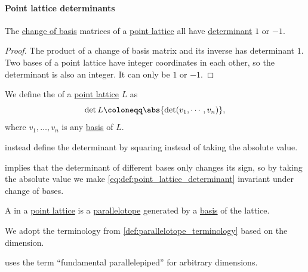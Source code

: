 \paragraph{Point lattice determinants}

\begin{proposition}\label{thm:point_lattice_determinant}
  The \hyperref[con:change_of_basis]{change of basis} matrices of a \hyperref[def:point_lattice]{point lattice} all have \hyperref[def:matrix_determinant]{determinant} \( 1 \) or \( -1 \).
\end{proposition}
\begin{proof}
  The product of a change of basis matrix and its inverse has determinant \( 1 \). Two bases of a point lattice have integer coordinates in each other, so the determinant is also an integer. It can only be \( 1 \) or \( -1 \).
\end{proof}

\begin{definition}\label{def:point_lattice_determinant}
  We define the  of a \hyperref[def:point_lattice]{point lattice} \( L \) as
  \begin{equation}\label{eq:def:point_lattice_determinant}
    \det L \coloneqq \abs{ \det(v_1, \cdots, v_n) },
  \end{equation}
  where \( v_1, \ldots, v_n \) is any \hyperref[def:point_lattice_basis]{basis} of \( L \).
\end{definition}
\begin{comments}
  \item \Textcite[5]{ConwaySloane1998SpherePackings} instead define the determinant by squaring instead of taking the absolute value.
\end{comments}
\begin{defproof}
   implies that the determinant of different bases only changes its sign, so by taking the absolute value we make \eqref{eq:def:point_lattice_determinant} invariant under change of bases.
\end{defproof}

\begin{definition}\label{def:fundamental_parallelotope}
  A  in a \hyperref[def:point_lattice]{point lattice} is a \hyperref[def:parallelotope]{parallelotope} generated by a \hyperref[def:point_lattice_basis]{basis} of the lattice.

  We adopt the terminology from \cref{def:parallelotope_terminology} based on the dimension.
\end{definition}
\begin{comments}
  \item \Textcite[69]{Cassels1997NumberGeometry} uses the term \enquote{fundamental parallelepiped} for arbitrary dimensions.
\end{comments}

